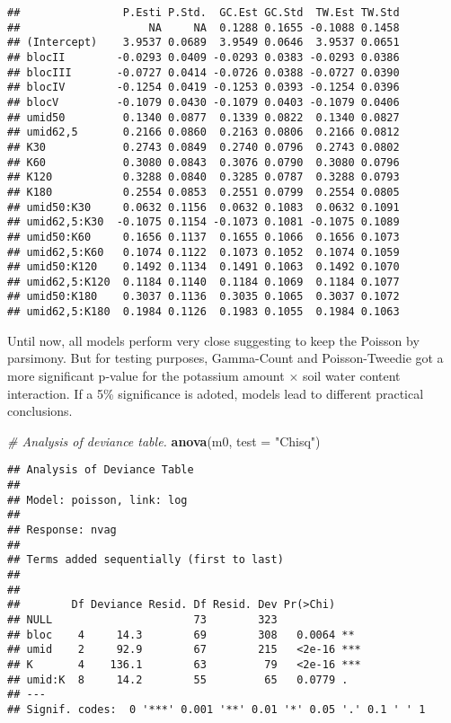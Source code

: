 \documentclass[9pt,a5paper,]{book}
\newenvironment{Shaded}{}{}
\newcommand{\KeywordTok}[1]{\textbf{{#1}}}
\newcommand{\DataTypeTok}[1]{\underline{{#1}}}
\newcommand{\StringTok}[1]{{#1}}
\newcommand{\CommentTok}[1]{\textit{{#1}}}
\newcommand{\NormalTok}[1]{{#1}}
\renewenvironment{Shaded}{\color{inputcolor}}{}
\renewcommand{\DataTypeTok}[1]{{#1}}
\theoremstyle{definition}
\theoremstyle{definition}
\theoremstyle{remark}
\begin{document}
\begin{verbatim}
##                P.Esti P.Std.  GC.Est GC.Std  TW.Est TW.Std
##                    NA     NA  0.1288 0.1655 -0.1088 0.1458
## (Intercept)    3.9537 0.0689  3.9549 0.0646  3.9537 0.0651
## blocII        -0.0293 0.0409 -0.0293 0.0383 -0.0293 0.0386
## blocIII       -0.0727 0.0414 -0.0726 0.0388 -0.0727 0.0390
## blocIV        -0.1254 0.0419 -0.1253 0.0393 -0.1254 0.0396
## blocV         -0.1079 0.0430 -0.1079 0.0403 -0.1079 0.0406
## umid50         0.1340 0.0877  0.1339 0.0822  0.1340 0.0827
## umid62,5       0.2166 0.0860  0.2163 0.0806  0.2166 0.0812
## K30            0.2743 0.0849  0.2740 0.0796  0.2743 0.0802
## K60            0.3080 0.0843  0.3076 0.0790  0.3080 0.0796
## K120           0.3288 0.0840  0.3285 0.0787  0.3288 0.0793
## K180           0.2554 0.0853  0.2551 0.0799  0.2554 0.0805
## umid50:K30     0.0632 0.1156  0.0632 0.1083  0.0632 0.1091
## umid62,5:K30  -0.1075 0.1154 -0.1073 0.1081 -0.1075 0.1089
## umid50:K60     0.1656 0.1137  0.1655 0.1066  0.1656 0.1073
## umid62,5:K60   0.1074 0.1122  0.1073 0.1052  0.1074 0.1059
## umid50:K120    0.1492 0.1134  0.1491 0.1063  0.1492 0.1070
## umid62,5:K120  0.1184 0.1140  0.1184 0.1069  0.1184 0.1077
## umid50:K180    0.3037 0.1136  0.3035 0.1065  0.3037 0.1072
## umid62,5:K180  0.1984 0.1126  0.1983 0.1055  0.1984 0.1063
\end{verbatim}

Until now, all models perform very close suggesting to keep the Poisson
by parsimony. But for testing purposes, Gamma-Count and Poisson-Tweedie
got a more significant p-value for the potassium amount \(\times\) soil
water content interaction. If a 5\% significance is adoted, models lead
to different practical conclusions.

\begin{Shaded}
\begin{Highlighting}[]
\CommentTok{# Analysis of deviance table.}
\KeywordTok{anova}\NormalTok{(m0, }\DataTypeTok{test =} \StringTok{"Chisq"}\NormalTok{)}
\end{Highlighting}
\end{Shaded}

\begin{verbatim}
## Analysis of Deviance Table
## 
## Model: poisson, link: log
## 
## Response: nvag
## 
## Terms added sequentially (first to last)
## 
## 
##        Df Deviance Resid. Df Resid. Dev Pr(>Chi)    
## NULL                      73        323             
## bloc    4     14.3        69        308   0.0064 ** 
## umid    2     92.9        67        215   <2e-16 ***
## K       4    136.1        63         79   <2e-16 ***
## umid:K  8     14.2        55         65   0.0779 .  
## ---
## Signif. codes:  0 '***' 0.001 '**' 0.01 '*' 0.05 '.' 0.1 ' ' 1
\end{verbatim}
\end{document}
